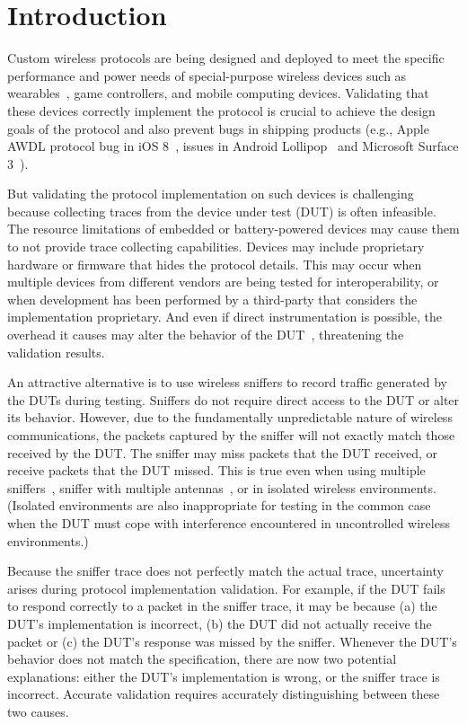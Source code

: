 
\section{Introduction}
\label{sec:intro}

Custom wireless protocols are being designed and deployed to meet the specific
performance and power needs of special-purpose wireless devices such as
wearables~\cite{iris}, game controllers, and mobile computing devices.
Validating that these devices correctly implement the protocol is crucial to
achieve the design goals of the protocol and also prevent bugs in shipping
products (e.g., Apple AWDL protocol bug in iOS 8~\cite{wifried}, \wifi{} issues
in Android Lollipop~\cite{lollipop} and Microsoft Surface 3~\cite{surface}).


But validating the protocol implementation on such devices is challenging
because collecting traces from the device under test (DUT) is often
infeasible.
The resource limitations of embedded or battery-powered devices may cause them
to not provide trace collecting capabilities.
Devices may include proprietary hardware or firmware that hides the protocol
details.
This may occur when multiple devices from different vendors are being tested
for interoperability, or when development has been performed by a third-party
that considers the implementation proprietary.
And even if direct instrumentation is possible, the overhead it causes may alter
the behavior of the DUT~\cite{mytkowicz2008observer}, threatening the validation
results.

An attractive alternative is to use wireless
sniffers to record traffic generated by the DUTs during testing.
Sniffers do not require direct access to the DUT or alter its behavior.
However, due to the fundamentally unpredictable nature of wireless
communications, the packets captured by the sniffer will not exactly match
those received by the DUT.
The sniffer may miss packets that the DUT received, or receive packets that
the DUT missed.
This is true even when using multiple
sniffers~\cite{cheng2006jigsaw,mahajan2006analyzing,bahl2006enhancing}, sniffer
with multiple antennas~\cite{omnipeek}, or in isolated wireless environments.
(Isolated environments are also inappropriate for testing in the common case
when the DUT must cope with interference encountered in uncontrolled wireless
environments.)

Because the sniffer trace does not perfectly match the actual trace,
uncertainty arises during protocol implementation validation.
For example, if the DUT fails to respond correctly to a packet in the sniffer
trace, it may be because (a) the DUT's implementation is incorrect, (b) the DUT
did not actually receive the packet or (c) the DUT's response was missed by the
sniffer.
Whenever the DUT's behavior does not match the specification, there are now two
potential explanations:
either the DUT's implementation is wrong, or the sniffer trace is incorrect.
Accurate validation requires accurately distinguishing between these two
causes.

